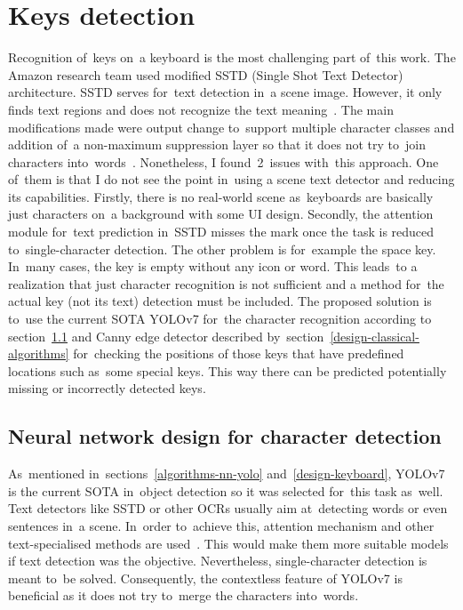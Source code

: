 \section{Keys detection}
\label{design-keys}
Recognition of~keys on~a keyboard is the most challenging part of~this work. The Amazon research team used modified SSTD (Single Shot Text Detector)~\cite{sstd} architecture. SSTD serves for~text detection in~a scene image. However, it only finds text regions and does not recognize the text meaning~\cite{sstd}. The main modifications made were output change to~support multiple character classes and addition of~a non-maximum suppression layer so that it does not try to~join characters into~words~\cite{amazon-paper}. Nonetheless, I found~2~issues with~this approach. One of~them is that I do not see the point in~using a scene text detector and reducing its capabilities. Firstly, there is no real-world scene as~keyboards are basically just characters on~a background with some UI design. Secondly, the attention module for~text prediction in~SSTD misses the mark once the task is reduced to~single-character detection. The other problem is for~example the space key. In~many cases, the key is empty without any icon or  word. This leads~to a realization that just character recognition is not sufficient and a method for~the actual key (not its text) detection must be included. The proposed solution is to~use the current SOTA YOLOv7 for~the character recognition according to section~\ref{design-nn-chars} and Canny edge detector described by~section~\ref{design-classical-algorithms} for~checking the positions of those keys that have predefined locations such as~some special keys. This way there can be predicted potentially missing or incorrectly detected keys.

\subsection{Neural network design for character detection}
\label{design-nn-chars}
As~mentioned in~sections~\ref{algorithms-nn-yolo} and~\ref{design-keyboard}, YOLOv7 is the current SOTA in~object detection so it was selected for~this task as~well. Text detectors like SSTD or other OCRs usually aim at~detecting words or even sentences in~a scene. In~order to~achieve this, attention mechanism and other text-specialised methods are used~\cite{sstd}. This would make them more suitable models if text detection was the objective. Nevertheless, single-character detection is meant to~be solved. Consequently, the contextless feature of YOLOv7 is beneficial as it does not try to~merge the characters into~words.

